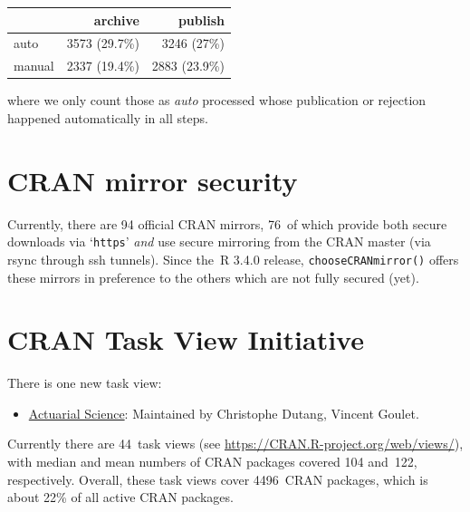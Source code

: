 \begin{longtable}[]{@{}lrr@{}}
\toprule\noalign{}
& archive & publish \\
\midrule\noalign{}
\endhead
\bottomrule\noalign{}
\endlastfoot
auto & 3573 (29.7\%) & 3246 (27\%) \\
manual & 2337 (19.4\%) & 2883 (23.9\%) \\
\end{longtable}

\noindent where we only count those as \emph{auto} processed whose publication or
rejection happened automatically in all steps.

\section{CRAN mirror security}\label{cran-mirror-security}

Currently, there are 94 official CRAN mirrors,
76~of which provide both
secure downloads via `\texttt{https}' \emph{and} use secure mirroring from the CRAN master
(via rsync through ssh tunnels). Since the~R 3.4.0 release, \texttt{chooseCRANmirror()}
offers these mirrors in preference to the others which are not fully secured (yet).

\section{CRAN Task View Initiative}\label{cran-task-view-initiative}

There is one new task view:

\begin{itemize}
\tightlist
\item
  \href{https://CRAN.R-project.org/view=ActuarialScience}{Actuarial Science}: Maintained by Christophe Dutang, Vincent Goulet.
\end{itemize}

Currently there are 44~task views (see \url{https://CRAN.R-project.org/web/views/}),
with median and mean numbers of CRAN packages covered
104 and~122, respectively.
Overall, these task views cover 4496~CRAN packages,
which is about 22\% of all active CRAN packages.


\address{%
Kurt Hornik\\
WU Wirtschaftsuniversität Wien\\%
Austria\\
%
%
\textit{ORCiD: \href{https://orcid.org/0000-0003-4198-9911}{0000-0003-4198-9911}}\\%
\href{mailto:Kurt.Hornik@R-project.org}{\nolinkurl{Kurt.Hornik@R-project.org}}%
}

